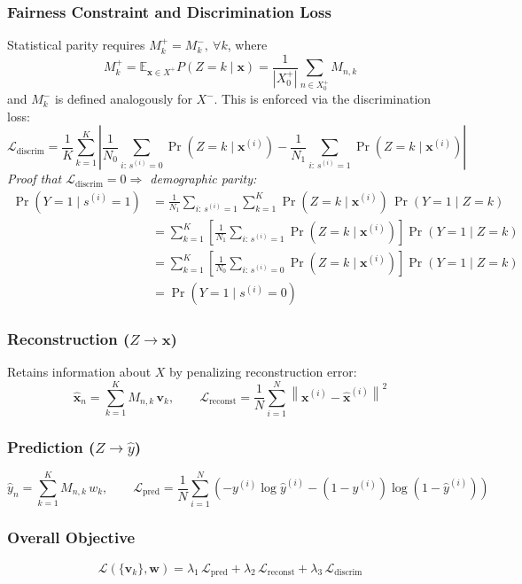 \documentclass[UTF8]{ctexart}
\begin{document}
\subsubsection{Fairness Constraint and Discrimination Loss}
Statistical parity requires $M_k^+ = M_k^-,\ \forall k$, where
\[
    M_k^+ = \mathbb{E}_{\mathbf{x} \in X^+} P(Z=k \mid \mathbf{x}) = \frac{1}{|X_0^+|} \sum_{n \in X_0^+} M_{n,k}
\]
and $M_k^-$ is defined analogously for $X^-$. This is enforced via the discrimination loss:
\[
    \mathcal{L}_{\mathrm{discrim}} = \frac{1}{K} \sum_{k=1}^{K} \left|
        \frac{1}{N_0} \sum_{i:\, s^{(i)}=0} \Pr(Z=k \mid \mathbf{x}^{(i)})
        - \frac{1}{N_1} \sum_{i:\, s^{(i)}=1} \Pr(Z=k \mid \mathbf{x}^{(i)})
    \right|
\]
\textit{Proof that $\mathcal{L}_{\mathrm{discrim}} = 0 \Rightarrow$ demographic parity:}
\begin{align*}
\Pr(Y=1 \mid s^{(i)}=1)
&= \frac{1}{N_1}\sum_{i:\,s^{(i)}=1}\sum_{k=1}^{K} \Pr(Z=k \mid \mathbf{x}^{(i)})\,\Pr(Y=1 \mid Z=k) \\
&= \sum_{k=1}^{K} \left[\frac{1}{N_1}\sum_{i:\,s^{(i)}=1} \Pr(Z=k \mid \mathbf{x}^{(i)})\right]\Pr(Y=1 \mid Z=k) \\
&= \sum_{k=1}^{K} \left[\frac{1}{N_0}\sum_{i:\,s^{(i)}=0} \Pr(Z=k \mid \mathbf{x}^{(i)})\right]\Pr(Y=1 \mid Z=k) \\
&= \Pr(Y=1 \mid s^{(i)}=0)
\end{align*}

\subsubsection{Reconstruction ($Z \to \mathbf{x}$)}
Retains information about $X$ by penalizing reconstruction error:
\[
    \hat{\mathbf{x}}_n = \sum_{k=1}^{K} M_{n,k}\, \mathbf{v}_k, \qquad
    \mathcal{L}_{\mathrm{reconst}} = \frac{1}{N}\sum_{i=1}^{N} \left\|\mathbf{x}^{(i)} - \hat{\mathbf{x}}^{(i)}\right\|^2
\]

\subsubsection{Prediction ($Z \to \hat{y}$)}
\[
    \hat{y}_n = \sum_{k=1}^{K} M_{n,k}\, w_k, \qquad
    \mathcal{L}_{\mathrm{pred}} = \frac{1}{N}\sum_{i=1}^{N}\left(-y^{(i)}\log\hat{y}^{(i)} - (1-y^{(i)})\log(1-\hat{y}^{(i)})\right)
\]

\subsubsection{Overall Objective}
\[
    \mathcal{L}(\{\mathbf{v}_k\}, \mathbf{w}) = \lambda_1\,\mathcal{L}_{\mathrm{pred}} + \lambda_2\,\mathcal{L}_{\mathrm{reconst}} + \lambda_3\,\mathcal{L}_{\mathrm{discrim}}
\]
\end{document}
